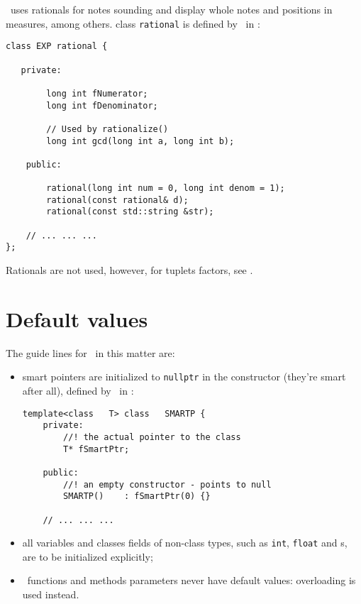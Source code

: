 \mf\ uses rationals for notes sounding and display whole notes and positions in measures, among others.
class   {\tt rational} is defined by \libmusicxml\ in :
\begin{lstlisting}[language=CPlusPlus]
class EXP rational {

   private:

        long int fNumerator;
        long int fDenominator;

        // Used by rationalize()
        long int gcd(long int a, long int b);

    public:

        rational(long int num = 0, long int denom = 1);
        rational(const rational& d);
        rational(const std::string &str);

	// ... ... ...
};
\end{lstlisting}

Rationals are not used, however, for tuplets factors, see .


\section{Default values}

The guide lines for \mf\ in this matter are:
\begin{itemize}
\item smart pointers are initialized to {\tt nullptr} in the  constructor (they're smart after all), defined by \libmusicxml\ in :
\begin{lstlisting}[language=CPlusPlus]
template<class   T> class   SMARTP {
	private:
		//! the actual pointer to the class
		T* fSmartPtr;

	public:
		//! an empty constructor - points to null
		SMARTP()	: fSmartPtr(0) {}

	// ... ... ...
\end{lstlisting}

\item all variables and classes fields of non-class   types, such as {\tt int}, {\tt float} and \enumType s, are to be initialized explicitly;

\item \mf\ functions and methods parameters never have default values: overloading is used instead.
\end{itemize}


